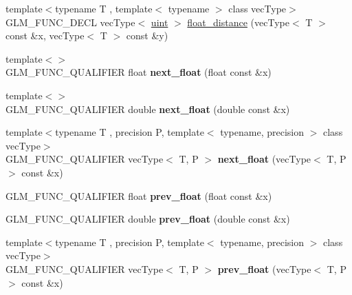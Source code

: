 \begin{DoxyCompactItemize}
\item 
{\footnotesize template$<$typename T , template$<$ typename $>$ class vec\-Type$>$ }\\G\-L\-M\-\_\-\-F\-U\-N\-C\-\_\-\-D\-E\-C\-L vec\-Type$<$ \hyperlink{group__core__precision_ga4fd29415871152bfb5abd588334147c8}{uint} $>$ \hyperlink{group__gtc__ulp_ga85355f2549d75789eb66e5d565d8ad26}{float\-\_\-distance} (vec\-Type$<$ T $>$ const \&x, vec\-Type$<$ T $>$ const \&y)
\item 
\hypertarget{namespaceglm_a094d145a4ae8efb9e42e88883cfb15f1}{{\footnotesize template$<$$>$ }\\G\-L\-M\-\_\-\-F\-U\-N\-C\-\_\-\-Q\-U\-A\-L\-I\-F\-I\-E\-R float {\bfseries next\-\_\-float} (float const \&x)}\label{namespaceglm_a094d145a4ae8efb9e42e88883cfb15f1}

\item 
\hypertarget{namespaceglm_a451149113e1a5083fcba0546de81ad51}{{\footnotesize template$<$$>$ }\\G\-L\-M\-\_\-\-F\-U\-N\-C\-\_\-\-Q\-U\-A\-L\-I\-F\-I\-E\-R double {\bfseries next\-\_\-float} (double const \&x)}\label{namespaceglm_a451149113e1a5083fcba0546de81ad51}

\item 
\hypertarget{namespaceglm_a7e678a59e625a9453c8847e3d0e01625}{{\footnotesize template$<$typename T , precision P, template$<$ typename, precision $>$ class vec\-Type$>$ }\\G\-L\-M\-\_\-\-F\-U\-N\-C\-\_\-\-Q\-U\-A\-L\-I\-F\-I\-E\-R vec\-Type$<$ T, P $>$ {\bfseries next\-\_\-float} (vec\-Type$<$ T, P $>$ const \&x)}\label{namespaceglm_a7e678a59e625a9453c8847e3d0e01625}

\item 
\hypertarget{namespaceglm_a1fd407652d7ccfbe810674a2e5cbc8eb}{G\-L\-M\-\_\-\-F\-U\-N\-C\-\_\-\-Q\-U\-A\-L\-I\-F\-I\-E\-R float {\bfseries prev\-\_\-float} (float const \&x)}\label{namespaceglm_a1fd407652d7ccfbe810674a2e5cbc8eb}

\item 
\hypertarget{namespaceglm_a82cdd5674b80569f118b33a6a327c9bd}{G\-L\-M\-\_\-\-F\-U\-N\-C\-\_\-\-Q\-U\-A\-L\-I\-F\-I\-E\-R double {\bfseries prev\-\_\-float} (double const \&x)}\label{namespaceglm_a82cdd5674b80569f118b33a6a327c9bd}

\item 
\hypertarget{namespaceglm_a90916626e6b0ed925938226f31b38c6b}{{\footnotesize template$<$typename T , precision P, template$<$ typename, precision $>$ class vec\-Type$>$ }\\G\-L\-M\-\_\-\-F\-U\-N\-C\-\_\-\-Q\-U\-A\-L\-I\-F\-I\-E\-R vec\-Type$<$ T, P $>$ {\bfseries prev\-\_\-float} (vec\-Type$<$ T, P $>$ const \&x)}\label{namespaceglm_a90916626e6b0ed925938226f31b38c6b}


\end{DoxyCompactItemize}
